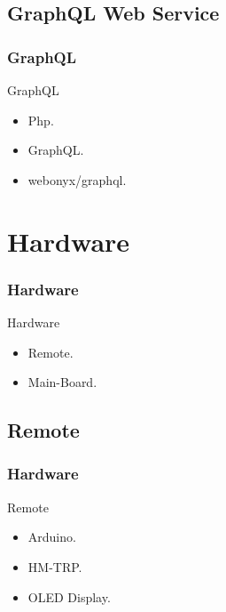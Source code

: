 \documentclass[aspectratio=169,11pt]{beamer}
\begin{document}
	\subsection{GraphQL Web Service}
	\begin{frame}
		\frametitle{GraphQL}
		\begin{block}{GraphQL}
			\begin{itemize}
				\item Php.
				\item GraphQL.
				\item webonyx/graphql.
			\end{itemize}
		\end{block}
	\end{frame}

	\section{Hardware}
	\begin{frame}
		\frametitle{Hardware}
		\begin{block}{Hardware}
			\begin{itemize}
				\item Remote.
				\item Main-Board.
			\end{itemize}
		\end{block}
	\end{frame}

	\subsection{Remote}
	\begin{frame}
		\frametitle{Hardware}
		\begin{block}{Remote}
			\begin{itemize}
				\item Arduino.
				\item HM-TRP.
				\item OLED Display.
			\end{itemize}
		\end{block}
	\end{frame}
\end{document}
